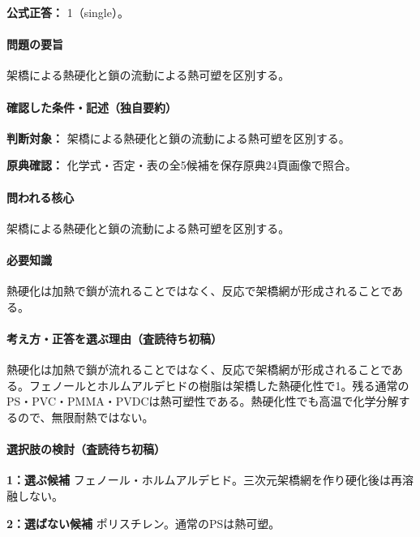\textbf{公式正答：} 1（single）。

\paragraph{問題の要旨} 架橋による熱硬化と鎖の流動による熱可塑を区別する。

\paragraph{確認した条件・記述（独自要約）}\mbox{}\par

\noindent\textbf{判断対象：} 架橋による熱硬化と鎖の流動による熱可塑を区別する。\par

\noindent\textbf{原典確認：} 化学式・否定・表の全5候補を保存原典24頁画像で照合。\par

\paragraph{問われる核心} 架橋による熱硬化と鎖の流動による熱可塑を区別する。

\paragraph{必要知識} 熱硬化は加熱で鎖が流れることではなく、反応で架橋網が形成されることである。

\paragraph{考え方・正答を選ぶ理由（査読待ち初稿）} 熱硬化は加熱で鎖が流れることではなく、反応で架橋網が形成されることである。フェノールとホルムアルデヒドの樹脂は架橋した熱硬化性で1。残る通常のPS・PVC・PMMA・PVDCは熱可塑性である。熱硬化性でも高温で化学分解するので、無限耐熱ではない。

\paragraph{選択肢の検討（査読待ち初稿）}\mbox{}\par

\noindent\textbf{1：選ぶ候補} フェノール・ホルムアルデヒド。三次元架橋網を作り硬化後は再溶融しない。\par

\noindent\textbf{2：選ばない候補} ポリスチレン。通常のPSは熱可塑。\par

